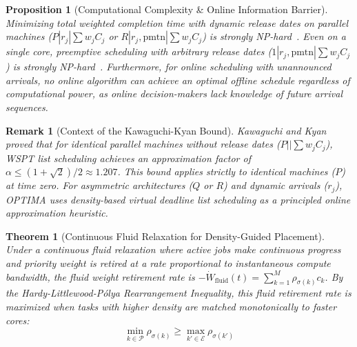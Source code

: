 \documentclass[conference]{IEEEtran}
\newtheorem{theorem}{Theorem}
\newtheorem{proposition}{Proposition}
\newtheorem{remark}{Remark}
\begin{document}
\begin{proposition}[Computational Complexity \& Online Information Barrier]
\label{prop:np_hard}
Minimizing total weighted completion time with dynamic release dates on parallel machines ($P | r_j | \sum w_j C_j$ or $R | r_j, \text{pmtn} | \sum w_j C_j$) is strongly NP-hard~\cite{lenstra1977complexity,garey1979computers}. Even on a single core, preemptive scheduling with arbitrary release dates ($1 | r_j, \text{pmtn} | \sum w_j C_j$) is strongly NP-hard~\cite{lenstra1977complexity}. Furthermore, for online scheduling with unannounced arrivals, no online algorithm can achieve an optimal offline schedule regardless of computational power, as online decision-makers lack knowledge of future arrival sequences.
\end{proposition}

\begin{remark}[Context of the Kawaguchi-Kyan Bound]
\label{rem:kawaguchi_kyan}
Kawaguchi and Kyan~\cite{kawaguchi1986worst} proved that for identical parallel machines without release dates ($P || \sum w_j C_j$), WSPT list scheduling achieves an approximation factor of $\alpha \le (1+\sqrt{2})/2 \approx 1.207$. This bound applies strictly to identical machines ($P$) at time zero. For asymmetric architectures ($Q$ or $R$) and dynamic arrivals ($r_j$), OPTIMA uses density-based virtual deadline list scheduling as a principled online approximation heuristic.
\end{remark}

\begin{theorem}[Continuous Fluid Relaxation for Density-Guided Placement]
\label{thm:rearrangement}
Under a continuous fluid relaxation where active jobs make continuous progress and priority weight is retired at a rate proportional to instantaneous compute bandwidth, the fluid weight retirement rate is $-\dot{W}_{\mathrm{fluid}}(t) = \sum_{k=1}^M \rho_{\sigma(k)} c_k$. By the Hardy-Littlewood-P\'olya Rearrangement Inequality, this fluid retirement rate is maximized when tasks with higher density are matched monotonically to faster cores:
\begin{equation}
\min_{k \in \mathcal{P}} \rho_{\sigma(k)} \ge \max_{k' \in \mathcal{E}} \rho_{\sigma(k')}
\end{equation}
\end{theorem}
\end{document}
